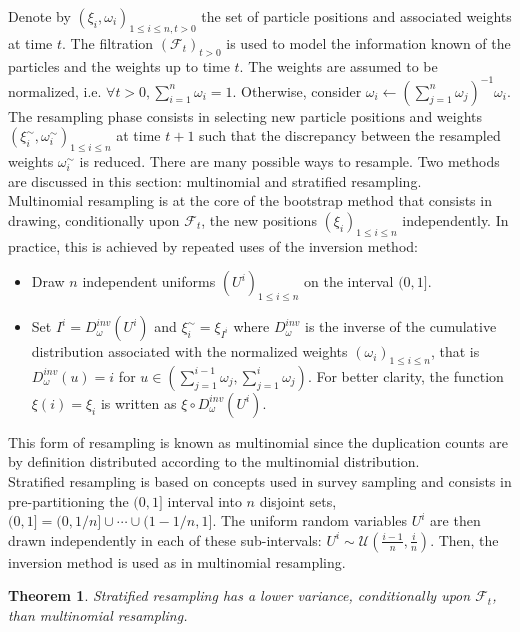 \documentclass[11pt,a4,twosided,singlespacing,titlepagenumber=on]{scrreprt}
\numberwithin{equation}{chapter} %
\newtheorem{theorem}{Theorem}%
\theoremstyle{remark}
\begin{document}
Denote by $\left( \xi_i, \omega_i \right)_{1 \leq i \leq n, t > 0}$ the set of particle positions and associated weights at time $t$. The filtration $(\mathcal{F}_t)_{t > 0}$ is used to model the information known of the particles and the weights up to time $t$. The weights are assumed to be normalized, i.e. $\forall t > 0, \sum_{i=1}^n \omega_i = 1$. Otherwise, consider $\omega_i \leftarrow \left( \sum_{j=1}^n \omega_j\right)^{-1} \omega_i$. The resampling phase consists in selecting new particle positions and weights $\left( \xi_i^\sim, \omega_i^\sim \right)_{1 \leq i \leq n}$ at time $t+1$ such that the discrepancy between the resampled weights $\omega_i^\sim$ is reduced. There are many possible ways to resample. Two methods are discussed in this section: multinomial and stratified resampling. \\


Multinomial resampling is at the core of the bootstrap method that consists in drawing, conditionally upon $\mathcal{F}_t$, the new positions $\left( \xi_i \right)_{1 \leq i \leq n}$ independently. In practice, this is achieved by repeated uses of the inversion method:
\begin{itemize}
\item Draw $n$ independent uniforms $(U^i)_{1 \leq i \leq n}$ on the interval $(0, 1]$.
\item Set $I^i = D_\omega^{inv}(U^i)$ and $\xi_i^\sim = \xi_{I^i}$ where $D_\omega^{inv}$ is the inverse of the cumulative distribution associated with the normalized weights $\left( \omega_i \right)_{1 \leq i \leq n}$, that is $D_\omega^{inv}(u) = i$ for $u \in \left( \sum_{j=1}^{i-1} \omega_j, \sum_{j=1}^i \omega_j \right)$. For better clarity, the function $\xi(i) = \xi_i$ is written as $\xi \circ D_\omega^{inv}(U^i)$.
\end{itemize}
This form of resampling is known as multinomial since the duplication counts are by definition distributed according to the multinomial distribution. \\


Stratified resampling is based on concepts used in survey sampling and consists in pre-partitioning the $(0,1]$ interval into $n$ disjoint sets, $(0,1] = (0, 1/n] \cup \cdots \cup (1-1/n, 1]$. The uniform random variables $U^i$ are then drawn independently in each of these sub-intervals: $U^i \sim \mathcal{U}\left( \frac{i-1}{n}, \frac{i}{n} \right)$. Then, the inversion method is used as in multinomial resampling.

\begin{theorem}
\textit{
Stratified resampling has a lower variance, conditionally upon $\mathcal{F}_t$, than multinomial resampling.
}
\end{theorem}
\end{document}
